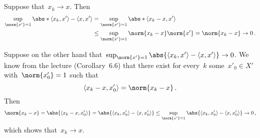 \subsection{}

Suppose that~$x_k \to x$.
Then
\begin{align*}
  \sup_{\norm{x'} = 1}
  \abs*{ \bil{x_k, x'} - \bil{x, x'} }
  &=
  \sup_{\norm{x'} = 1}
  \abs*{ \bil{x_k - x, x'} }
  \\
  &\leq
  \sup_{\norm{x'} = 1}
  \norm{x_k - x} \norm{x'}
  =
  \norm{x_k - x}
  \to
  0 \,.
\end{align*}

Suppose on the other hand that~$\sup_{\norm{x'} = 1} \abs{ \bil{x_k, x'} - \bil{x, x'} } \to 0$.
We know from the lecture (Corollary~6.6) that there exist for every~$k$ some~$x'_0 \in X'$ with~$\norm{x'_0} = 1$ such that
\[
    \bil{x_k - x, x'_0}
  = \norm{x_k - x} \,.
\]
Then
\[
        \norm{x_k - x}
   =    \abs{ \bil{x_k - x, x'_0} }
   =    \abs{ \bil{x_k, x'_0} - \bil{x, x'_0} }
   \leq \sup_{\norm{x'}  = 1} \abs{ \bil{x_k, x'_0} - \bil{x, x'_0} }
   \to  0 \,,
\]
which shows that~$x_k \to x$.





